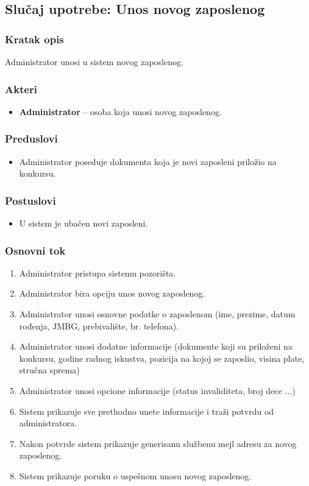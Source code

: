 \subsection{Slučaj upotrebe: Unos novog zaposlenog}

\subsubsection*{Kratak opis}
Administrator unosi u sistem novog zaposlenog.

\subsubsection*{Akteri}
\begin{itemize}
    \item \textbf{Administrator} -- osoba koja unosi novog zaposlenog.
\end{itemize}
\subsubsection*{Preduslovi}
\begin{itemize}
    \item  Administrator poseduje dokumenta koja je novi zaposleni priložio na konkursu.
\end{itemize}

\subsubsection*{Postuslovi}
\begin{itemize}
    \item U sistem je ubačen novi zaposleni.
\end{itemize}

\subsubsection*{Osnovni tok}
\begin{enumerate}
    \item Administrator pristupa sistemu pozorišta.
    \item Administrator bira opciju unos novog zaposlenog.
    \item Administrator unosi osnovne podatke o zaposlenom (ime, prezime, datum rođenja, JMBG, prebivalište, br. telefona).
    \item Administrator unosi dodatne informacije (dokumente koji su priloženi na konkursu, godine radnog iskustva, pozicija na kojoj se zaposlio, visina plate, stručna sprema)
    \item Administrator unosi opcione informacije (status invaliditeta, broj dece ...)
    \item Sistem prikazuje sve prethodno unete informacije i traži potvrdu od administratora.
    \item Nakon potvrde sistem prikazuje generisanu službenu mejl adresu za novog zaposlenog.
    \item Sistem prikazuje poruku o uspešnom unosu novog zaposlenog.
\end{enumerate}

